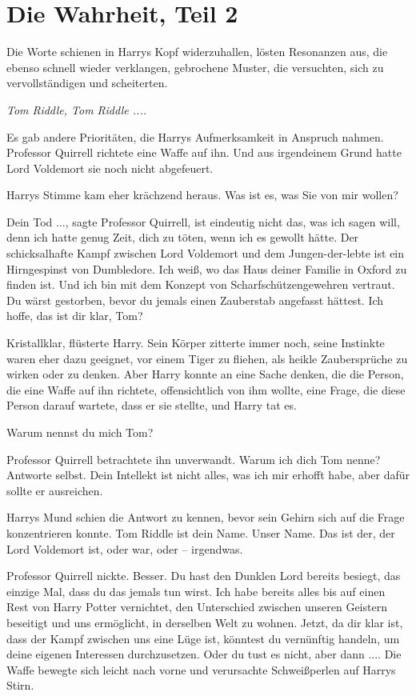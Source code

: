\chapter{Die Wahrheit, Teil 2}

Die Worte schienen in Harrys Kopf widerzuhallen, lösten Resonanzen aus, die
ebenso schnell wieder verklangen, gebrochene Muster, die versuchten, sich zu
vervollständigen und scheiterten.

\emph{Tom Riddle, Tom Riddle ....}

Es gab andere Prioritäten, die Harrys Aufmerksamkeit in Anspruch nahmen.
Professor Quirrell richtete eine Waffe auf ihn. Und aus irgendeinem Grund hatte
Lord Voldemort sie noch nicht abgefeuert.

Harrys Stimme kam eher krächzend heraus. \glqq{}Was ist es, was Sie von mir
wollen?\grqq{}

\glqq{}Dein Tod ...\grqq{}, sagte Professor Quirrell, \glqq{}ist eindeutig nicht
das, was ich sagen will, denn ich hatte genug Zeit, dich zu töten, wenn ich es
gewollt hätte. Der schicksalhafte Kampf zwischen Lord Voldemort und dem
Jungen-der-lebte ist ein Hirngespinst von Dumbledore. Ich weiß, wo das Haus
deiner Familie in Oxford zu finden ist. Und ich bin mit dem Konzept von
Scharfschützengewehren vertraut. Du wärst gestorben, bevor du jemals einen
Zauberstab angefasst hättest. Ich hoffe, das ist dir klar, Tom?\grqq{}

\glqq{}Kristallklar\grqq{}, flüsterte Harry. Sein Körper zitterte immer noch,
seine Instinkte waren eher dazu geeignet, vor einem Tiger zu fliehen, als heikle
Zaubersprüche zu wirken oder zu denken. Aber Harry konnte an eine Sache denken,
die die Person, die eine Waffe auf ihn richtete, offensichtlich von ihm wollte,
eine Frage, die diese Person darauf wartete, dass er sie stellte, und Harry tat
es.

\glqq{}Warum nennst du mich Tom?\grqq{}

Professor Quirrell betrachtete ihn unverwandt. \glqq{}Warum ich dich Tom nenne?
Antworte selbst. Dein Intellekt ist nicht alles, was ich mir erhofft habe, aber
dafür sollte er ausreichen.\grqq{}

Harrys Mund schien die Antwort zu kennen, bevor sein Gehirn sich auf die Frage
konzentrieren konnte. \glqq{}Tom Riddle ist dein Name. Unser Name. Das ist der,
der Lord Voldemort ist, oder war, oder – irgendwas.\grqq{}

Professor Quirrell nickte. \glqq{}Besser. Du hast den Dunklen Lord bereits
besiegt, das einzige Mal, dass du das jemals tun wirst. Ich habe bereits alles
bis auf einen Rest von Harry Potter vernichtet, den Unterschied zwischen unseren
Geistern beseitigt und uns ermöglicht, in derselben Welt zu wohnen. Jetzt, da
dir klar ist, dass der Kampf zwischen uns eine Lüge ist, könntest du vernünftig
handeln, um deine eigenen Interessen durchzusetzen. Oder du tust es nicht, aber
dann ....\grqq{} Die Waffe bewegte sich leicht nach vorne und verursachte Schweißperlen
auf Harrys Stirn.

